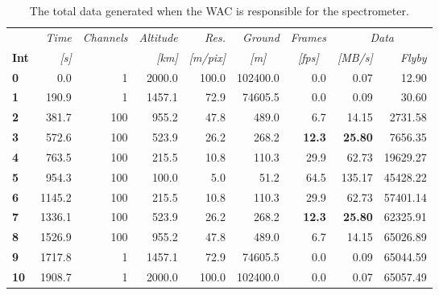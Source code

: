 \begin{table}[htb]
  \centering
    \begin{tabular}{l|r|r|r|r|r|r|r|r}
      & \textit{Time} & \textit{Channels} & \textit{Altitude} & \textit{Res.} & \textit{Ground} & \textit{Frames } & \multicolumn{2}{c}{\textit{Data}} \\
\textbf{Int} & \textit{[s]} & \textit{} & \textit{[km]} & \textit{[m/pix]} & \multicolumn{1}{c|}{\textit{[m]}} & \multicolumn{1}{c|}{\textit{[fps]}} & \textit{[MB/s]} & \textit{Flyby} \bigstrut[b]\\
\hline
\textbf{0} & 0.0   & 1     & 2000.0 & 100.0 & 102400.0 & 0.0   & 0.07  & 12.90 \bigstrut[t]\\
\textbf{1} & 190.9 & 1     & 1457.1 & 72.9  & 74605.5 & 0.0   & 0.09  & 30.60 \\
\textbf{2} & 381.7 & 100   & 955.2 & 47.8  & 489.0 & 6.7   & 14.15 & 2731.58 \\
\textbf{3} & 572.6 & 100   & 523.9 & 26.2  & 268.2 & \textbf{12.3} & \textbf{25.80} & 7656.35 \\
\textbf{4} & 763.5 & 100   & 215.5 & 10.8  & 110.3 & 29.9  & 62.73 & 19629.27 \\
\textbf{5} & 954.3 & 100   & 100.0 & 5.0   & 51.2  & 64.5  & 135.17 & 45428.22 \\
\textbf{6} & 1145.2 & 100   & 215.5 & 10.8  & 110.3 & 29.9  & 62.73 & 57401.14 \\
\textbf{7} & 1336.1 & 100   & 523.9 & 26.2  & 268.2 & \textbf{12.3} & \textbf{25.80} & 62325.91 \\
\textbf{8} & 1526.9 & 100   & 955.2 & 47.8  & 489.0 & 6.7   & 14.15 & 65026.89 \\
\textbf{9} & 1717.8 & 1     & 1457.1 & 72.9  & 74605.5 & 0.0   & 0.09  & 65044.59 \\
\textbf{10} & 1908.7 & 1     & 2000.0 & 100.0 & 102400.0 & 0.0   & 0.07  & 65057.49 \\
\end{tabular}%
  \caption{The total data generated when the WAC is responsible for the spectrometer.}
  \label{tab:wac_flyby_data_spectrometer_final}%
\end{table}%
